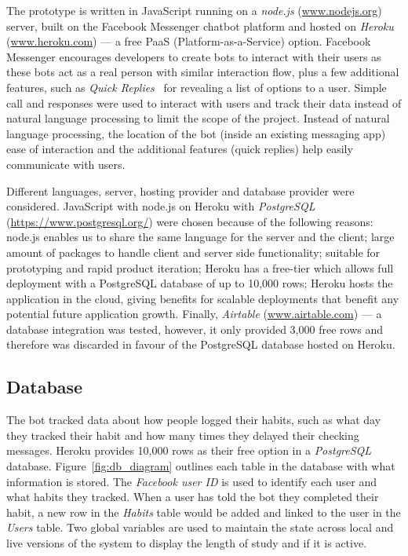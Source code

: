 The prototype is written in JavaScript running on a \textit{node.js} (\url{www.nodejs.org}) server, built on the Facebook Messenger chatbot platform and hosted on \textit{Heroku} (\url{www.heroku.com}) --- a free PaaS (Platform-as-a-Service) option. Facebook Messenger encourages developers to create bots to interact with their users as these bots act as a real person with similar interaction flow, plus a few additional features, such as \textit{Quick Replies}~\cite{doc_fb_quick_replies} for revealing a list of options to a user. Simple call and responses were used to interact with users and track their data instead of natural language processing to limit the scope of the project. Instead of natural language processing, the location of the bot (inside an existing messaging app) ease of interaction and the additional features (quick replies) help easily communicate with users.


Different languages, server, hosting provider and database provider were considered. JavaScript with node.js on Heroku with \textit{PostgreSQL} (\url{https://www.postgresql.org/}) were chosen because of the following reasons: node.js enables us to share the same language for the server and the client; large amount of packages to handle client and server side functionality; suitable for prototyping and rapid product iteration; Heroku has a free-tier which allows full deployment with a PostgreSQL database of up to 10,000 rows; Heroku hosts the application in the cloud, giving benefits for scalable deployments that benefit any potential future application growth. Finally, \textit{Airtable} (\url{www.airtable.com}) --- a database integration was tested, however, it only provided 3,000 free rows and therefore was discarded in favour of the PostgreSQL database hosted on Heroku.


\subsection{Database}
The bot tracked data about how people logged their habits, such as what day they tracked their habit and how many times they delayed their checking messages. Heroku provides 10,000 rows as their free option in a \textit{PostgreSQL} database. Figure~\ref{fig:db_diagram} outlines each table in the database with what information is stored. The \textit{Facebook user ID} is used to identify each user and what habits they tracked. When a user has told the bot they completed their habit, a new row in the \textit{Habits} table would be added and linked to the user in the \textit{Users} table. Two global variables are used to maintain the state across local and live versions of the system to display the length of study and if it is active.


